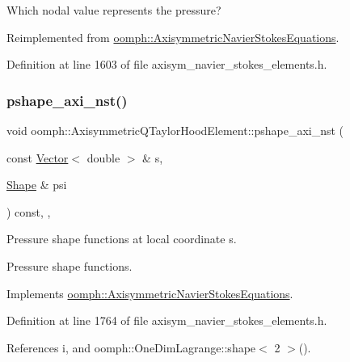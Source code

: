 Which nodal value represents the pressure? 



Reimplemented from \hyperlink{classoomph_1_1AxisymmetricNavierStokesEquations_a47c61dbb8a32fd785c99ab3aa8bc35f9}{oomph\+::\+Axisymmetric\+Navier\+Stokes\+Equations}.



Definition at line 1603 of file axisym\+\_\+navier\+\_\+stokes\+\_\+elements.\+h.

\mbox{\label{classoomph_1_1AxisymmetricQTaylorHoodElement_ab4eea01cdcd97616ce75e6547c0c4338}} 
\subsubsection{\texorpdfstring{pshape\+\_\+axi\+\_\+nst()}{pshape\_axi\_nst()}\hspace{0.1cm}{\footnotesize\ttfamily [1/2]}}
{\footnotesize\ttfamily void oomph\+::\+Axisymmetric\+Q\+Taylor\+Hood\+Element\+::pshape\+\_\+axi\+\_\+nst (\begin{DoxyParamCaption}\item[{const \hyperlink{classoomph_1_1Vector}{Vector}$<$ double $>$ \&}]{s,  }\item[{\hyperlink{classoomph_1_1Shape}{Shape} \&}]{psi }\end{DoxyParamCaption}) const\hspace{0.3cm}{\ttfamily [inline]}, {\ttfamily [protected]}, {\ttfamily [virtual]}}



Pressure shape functions at local coordinate s. 

Pressure shape functions. 

Implements \hyperlink{classoomph_1_1AxisymmetricNavierStokesEquations_a6309780fd1964c4df0cca0818ccff158}{oomph\+::\+Axisymmetric\+Navier\+Stokes\+Equations}.



Definition at line 1764 of file axisym\+\_\+navier\+\_\+stokes\+\_\+elements.\+h.



References i, and oomph\+::\+One\+Dim\+Lagrange\+::shape$<$ 2 $>$().



